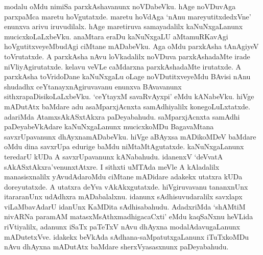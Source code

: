 modalu oMdu nimiSa parxkAshavanunx noVDabeVku. hAge noVDuvAga parxpaMca maretu hoVgutatxde. maretu hoVdAga `nAnu mareyutitxdedxVne' enunxva arivu iruvudilalx. hAge maretiruva samayadalilx kaNuNxgaLanunx mucicxkoLaLxbeVku. anaMtara eraDu kaNuNxgaLU aMtamuRKavAgi hoVgutitxveyeMbudAgi ciMtane mADabeVku. Aga oMdu parxkAsha tAnAgiyeV toVrutatxde. A parxkAsha nAvu loVkadalilx noVDuva parxkAshadaMte irade niVliyAgirutatxde. kelavu veVLe caMdarxna parxkAshadaMte irutatxde. A parxkAsha toVridoDane kaNuNxgaLu oLage noVDutitxveyeMdu BAvisi nAnu shudadhx ceYtanayxnAgiruvavanu enunxva BAvavanunx sithxrapaDisikoLaLxbeVku. `ceYtayxM savaRvAyxpi' eMdu kANabeVku. hiVge mADutAtx baMdare adu asaMparxjAcnxta samAdhiyalilx konegoLuLxtatxde. adariMda AtamxsAkASxtAkxra paDeyabahudu. saMparxjAcnxta samAdhi paDeyabeVkAdare kaNuNxgaLanunx mucicxkoMDu BagavaMtana savxrUpavanunx dhAyxnamADabeVku. hiVge aBAyxsa mADikoMDeV baMdare oMdu dina savxrUpa edurige baMdu niMtaMtAgutatxde. kaNuNxgaLanunx teredarU kUDa A savxrUpavanunx kANabahudu. idanenxV `deVvatA sAkASxtAkxra'venunxtAtxre. I sithxti uMTAda meVle A kAladalilx manasisxnalilx yAvudAdaroMdu ciMtane mADidare adakekx utatxra kUDa doreyutatxde. A utatxra deYva vAkAkxgutatxde. hiVgiruvavanu tananxnUnx itararanUnx udAdhxra mADabalalxnu. idanunx sAdhisuvudaralilx savxlapx viLaMbavAdarU idanUnx KaMDita sAdhisabahudu. AdadxriMda `shAMtiM nivARNa paramAM matasxMsAthxmadhigacaCxti' eMdu kaqSaNxnu heVLida riVtiyalilx, adanunx iSaTx paTeTxV nAvu dhAyxna modalAdavugaLanunx mADutetxVve. idakekx beVkAda sAdhana-saMpatutxgaLanunx iTuTxkoMDu nAvu dhAyxna mADutAtx baMdare sherxVyasasxnunx paDeyabahudu.


\endchapter
